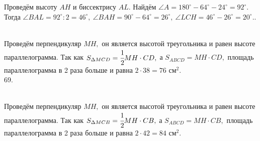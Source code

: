 \documentclass[12pt]{article}
\begin{document}
Проведём высоту $AH$ и биссектрису $AL.$ Найдём $\angle A=180^\circ-64^\circ-24^\circ=92^\circ.$ Тогда $\angle BAL=92^\circ:2=46^\circ,\ \angle BAH=90^\circ-64^\circ=26^\circ,\ \angle LCH=46^\circ-26^\circ=20^\circ.$\newpage{}. \begin{figure}[ht!]
\end{figure}\\
Проведём перпендикуляр $MH,$ он является высотой треугольника и равен высоте параллелограмма. Так как $S_{\Delta MCD}=\cfrac{1}{2}MH\cdot CD,$ а $S_{ABCD}=MH\cdot CD,$ площадь параллелограмма в 2 раза больше и равна $2\cdot38=76\text{ см}^2.$\\
69. \begin{figure}[ht!]
\end{figure}\\
Проведём перпендикуляр $MH,$ он является высотой треугольника и равен высоте параллелограмма. Так как $S_{\Delta MCB}=\cfrac{1}{2}MH\cdot CB,$ а $S_{ABCD}=MH\cdot CB,$ площадь параллелограмма в 2 раза больше и равна $2\cdot42=84\text{ см}^2.$\\
\end{document}
